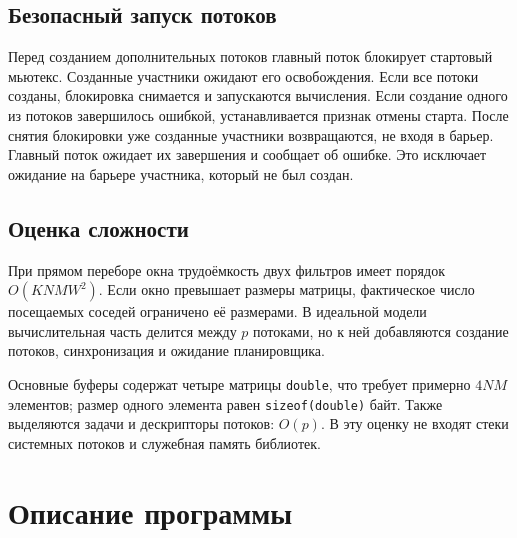 \subsection{Безопасный запуск потоков}
Перед созданием дополнительных потоков главный поток блокирует
стартовый мьютекс. Созданные участники ожидают его освобождения.
Если все потоки созданы, блокировка снимается и запускаются вычисления.
Если создание одного из потоков завершилось ошибкой, устанавливается
признак отмены старта. После снятия блокировки уже созданные участники
возвращаются, не входя в барьер. Главный поток ожидает их завершения
и сообщает об ошибке. Это исключает ожидание на барьере участника,
который не был создан.

\subsection{Оценка сложности}
При прямом переборе окна трудоёмкость двух фильтров имеет порядок
\(O(KNMW^2)\). Если окно превышает размеры матрицы, фактическое число
посещаемых соседей ограничено её размерами. В идеальной модели
вычислительная часть делится между \(p\) потоками, но к ней добавляются
создание потоков, синхронизация и ожидание планировщика.

Основные буферы содержат четыре матрицы \texttt{double}, что требует
примерно \(4NM\) элементов; размер одного элемента равен \texttt{sizeof(double)} байт.
Также выделяются задачи и дескрипторы потоков: \(O(p)\).
В эту оценку не входят стеки системных потоков и служебная память библиотек.

\section{Описание программы}
